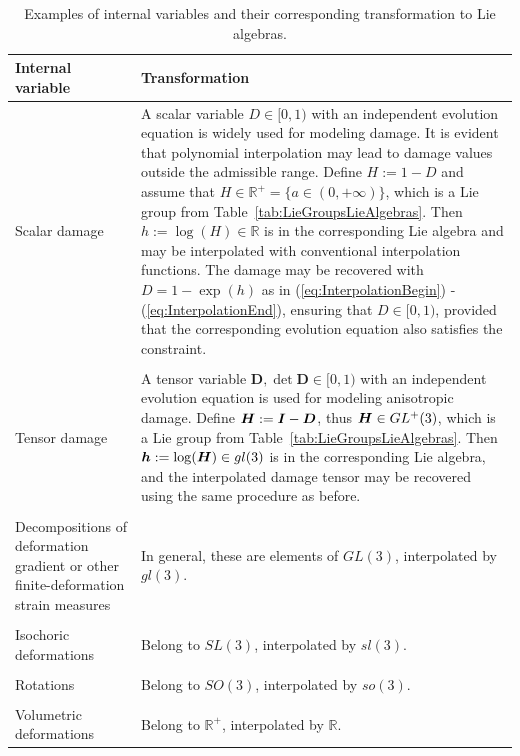 \documentclass[12pt]{article}
\newcommand{\mbs}[1]{\boldsymbol{#1}}
\newcommand{\mbb}[1]{\mathbb{#1}}
\def\bD{{\mbs{D}}} \def\bE{{\mbs{E}}} \def\bF{{\mbs{F}}}
\begin{document}
\begin{table}[htbp]
  \begin{center}
    \begin{tabular}{ p{72mm} p{80mm} }
      \toprule
      Internal variable
      &
      Transformation
      \\
      \hline
      Scalar damage
      &
      A scalar variable $D \in [0,1)$ with an
      independent evolution equation is widely used for modeling damage.
      It is evident that polynomial interpolation may lead to damage
      values outside the admissible range. Define $H := 1 - D$ and assume
      that $H \in \mbb{R}^+ = \{ a \in (0,+\infty) \}$, which is a Lie
      group from Table~\ref{tab:LieGroupsLieAlgebras}. Then $h := \log(H)
      \in \mbb{R}$ is in the corresponding Lie algebra and may be
      interpolated with conventional interpolation functions. The damage
      may be recovered with $D = 1 - \exp(h)$ as in
      (\ref{eq:InterpolationBegin}) - (\ref{eq:InterpolationEnd}),
      ensuring that $D \in [0,1)$, provided that the corresponding
      evolution equation also satisfies the constraint.
      \\
      \\
      Tensor damage
      &
      A tensor variable $\bD, \det\bD \in [0,1)$
      with an independent evolution equation is used for modeling
      anisotropic damage. Define $\bH := \bI - \bD$, thus $\bH \in
      GL^+(3)$, which is a Lie group from
      Table~\ref{tab:LieGroupsLieAlgebras}. Then $\bh := \log(\bH) \in
      gl(3)$ is in the corresponding Lie algebra, and the interpolated
      damage tensor may be recovered using the same procedure as before.
      \\
      \\
      Decompositions of deformation gradient or other
      finite-deformation strain measures
      &      
      In general, these are
      elements of $GL(3)$, interpolated by $gl(3)$.
      \\
      \\
      Isochoric deformations
      &
      Belong to $SL(3)$, interpolated by
      $sl(3)$.
      \\
      \\
      Rotations
      &
      Belong to $SO(3)$, interpolated by $so(3)$.
      \\
      \\
      Volumetric deformations
      &
      Belong to $\mbb{R}^+$, interpolated by
      $\mbb{R}$.
      \\
      \bottomrule
    \end{tabular}
    \caption{Examples of internal variables and their corresponding
      transformation to Lie algebras.}
    \label{tab:ExamplesIV}
  \end{center}
\end{table}
\end{document}
